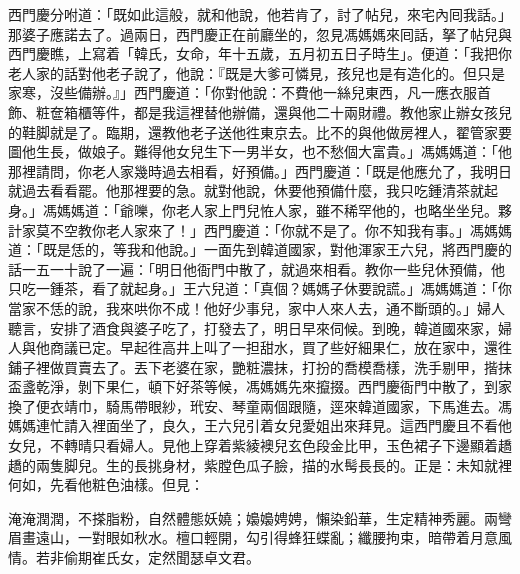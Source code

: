 西門慶分咐道：「既如此這般，就和他說，他若肯了，討了帖兒，來宅內囘我話。」那婆子應諾去了。過兩日，西門慶正在前廳坐的，忽見馮媽媽來囘話，拏了帖兒與西門慶瞧，上寫着「韓氏，女命，年十五歲，五月初五日子時生」。便道：「我把你老人家的話對他老子說了，他說：『既是大爹可憐見，孩兒也是有造化的。但只是家寒，沒些備辦。』」西門慶道：「你對他說：不費他一絲兒東西，凡一應衣服首飾、粧奩箱櫃等件，都是我這裡替他辦備，還與他二十兩財禮。教他家止辦女孩兒的鞋脚就是了。臨期，還教他老子送他徃東京去。比不的與他做房裡人，翟管家要圖他生長，做娘子。難得他女兒生下一男半女，也不愁個大富貴。」馮媽媽道：「他那裡請問，你老人家幾時過去相看，好預備。」西門慶道：「既是他應允了，我明日就過去看看罷。他那裡要的急。就對他說，休要他預備什麼，我只吃鍾清茶就起身。」馮媽媽道：「爺嚛，你老人家上門兒恠人家，雖不稀罕他的，也略坐坐兒。夥計家莫不空教你老人家來了！」西門慶道：「你就不是了。你不知我有事。」馮媽媽道：「既是恁的，等我和他說。」一面先到韓道國家，對他渾家王六兒，將西門慶的話一五一十說了一遍：「明日他衙門中散了，就過來相看。教你一些兒休預備，他只吃一鍾茶，看了就起身。」王六兒道：「真個？媽媽子休要說謊。」馮媽媽道：「你當家{}不恁的說，我來哄你不成！他好少事兒，家中人來人去，通不斷頭的。」婦人聽言，安排了酒食與婆子吃了，打發去了，明日早來伺候。到晚，韓道國來家，婦人與他商議已定。早起徃高井上叫了一担甜水，買了些好細果仁，放在家中，還徃鋪子裡做買賣去了。丟下老婆在家，{}艷粧濃抹，打扮的喬模喬樣，洗手剔甲，揩抹盃盞乾淨，剝下果仁，頓下好茶等候，馮媽媽先來攛掇。西門慶衙門中散了，到家換了便衣靖巾，騎馬帶眼紗，玳安、琴童兩個跟隨，逕來韓道國家，下馬進去。馮媽媽連忙請入裡面坐了，良久，王六兒引着女兒愛姐出來拜見。這西門慶且不看他女兒，不轉晴只看婦人。見他上穿着紫綾襖兒玄色段金比甲，玉色裙子下邊顯着趫趫的兩隻脚兒。生的長挑身材，紫膛色瓜子臉，描的水髩長長的。{}正是：未知就裡何如，先看他粧色油樣。但見：

\begin{myquote}
淹淹潤潤，不搽脂粉，自然體態妖嬈；嬝嬝娉娉，懶染鉛華，生定精神秀麗。兩彎眉畫遠山，一對眼如秋水。檀口輕開，勾引得蜂狂蝶亂；纖腰拘束，暗帶着月意風情。若非偷期崔氏女，定然聞瑟卓文君。
\end{myquote}

